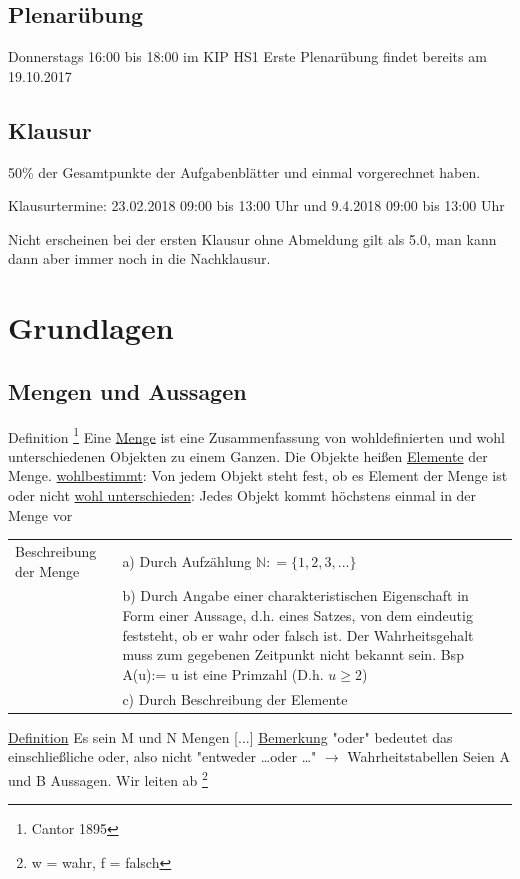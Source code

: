\documentclass[12pt,a4paper]{article} %
\begin{document}
\subsection{Plenarübung}
Donnerstags 16:00 bis 18:00 im KIP HS1 \newline
Erste Plenarübung findet bereits am 19.10.2017

\subsection{Klausur}
50\% der Gesamtpunkte der Aufgabenblätter und einmal vorgerechnet haben.

Klausurtermine: 23.02.2018 09:00 bis 13:00 Uhr und 9.4.2018 09:00 bis 13:00 Uhr

Nicht erscheinen bei der ersten Klausur ohne Abmeldung gilt als 5.0, man kann dann aber immer noch in die Nachklausur.

\section{Grundlagen}
\subsection{Mengen und Aussagen}
Definition \footnote{Cantor 1895}\newline
Eine \underline{Menge} ist eine Zusammenfassung von wohldefinierten und wohl unterschiedenen Objekten zu einem Ganzen. Die Objekte heißen \underline{Elemente} der Menge. \newline
\underline{wohlbestimmt}: Von jedem Objekt steht fest, ob es Element der Menge ist oder nicht \newline
\underline{wohl unterschieden}: Jedes Objekt kommt höchstens einmal in der Menge vor \newline
\begin{tabular}{l l}
Beschreibung der Menge & a) Durch Aufzählung $\mathbb{N}: = \{1, 2, 3, ...\} $\\
& \parbox[t]{8cm}{b) Durch Angabe einer charakteristischen Eigenschaft in Form einer Aussage, d.h. eines Satzes, von dem eindeutig feststeht, ob er wahr oder falsch ist. Der Wahrheitsgehalt muss zum gegebenen Zeitpunkt nicht bekannt sein.
	Bsp A(u):= u ist eine Primzahl (D.h. $u \ge 2$)} \\
& c) Durch Beschreibung der Elemente 
\end{tabular}
\newline
\underline{Definition} Es sein M und N Mengen
[...]
\newline
\underline{Bemerkung}
"oder" bedeutet das einschließliche oder, also nicht "{}entweder \dots oder \dots" $\rightarrow$ Wahrheitstabellen \newline
Seien A und B Aussagen. Wir leiten ab \footnote{w = wahr, f = falsch}
\end{document}
